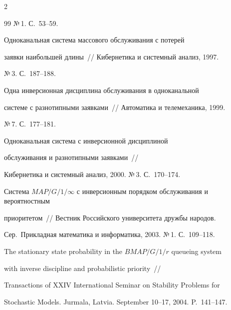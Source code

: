 \begin{multicols}{2}
{{\begin{thebibliography}{99}
№\,1. С.~53--59.









Одноканальная система массового обслуживания с потерей


заявки наибольшей длины~// Кибернетика и системный анализ, 1997.


№\,3. С.~187--188.









Одна инверсионная дисциплина обслуживания в одноканальной


системе с разнотипными заявками~// Автоматика и телемеханика, 1999.


№\,7. С.~177--181.









Одноканальная система с инверсионной дисциплиной


обслуживания и разнотипными заявками~//


Кибернетика и системный анализ, 2000. №\,3. С.~170--174.









Система $M\!AP/G/1/\infty$ с инверсионным порядком обслуживания и вероятностным


приоритетом~// Вестник Российского университета дружбы народов.


Сер.\ Прикладная математика и информатика, 2003. №\,1. С.~109--118.









The stationary state probability in the $BMAP/G/1/r$ queueing system


with inverse discipline and probabilistic priority~//


Transactions of XXIV International Seminar on Stability Problems for


Stochastic Models. Jurmala, Latvia. September 10--17, 2004. P.~141--147.






\end{thebibliography}}}
\end{multicols}
